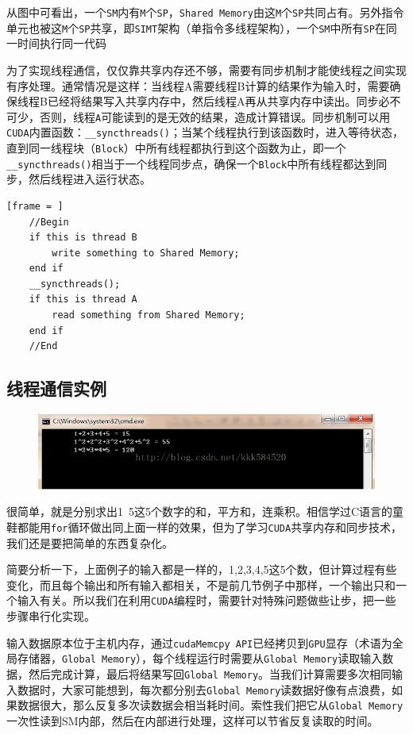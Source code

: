 \documentclass[UTF8,a4paper,12pt]{ctexbook}
\begin{document}
			从图中可看出，一个\verb|SM|内有\verb|M|个\verb|SP|，\verb|Shared Memory|由这\verb|M|个\verb|SP|共同占有。另外指令单元也被这\verb|M|个\verb|SP|共享，即\verb|SIMT|架构（单指令多线程架构），一个\verb|SM|中所有\verb|SP|在同一时间执行同一代码
			
			为了实现线程通信，仅仅靠共享内存还不够，需要有同步机制才能使线程之间实现有序处理。通常情况是这样：当线程A需要线程B计算的结果作为输入时，需要确保线程B已经将结果写入共享内存中，然后线程A再从共享内存中读出。同步必不可少，否则，线程\verb|A|可能读到的是无效的结果，造成计算错误。同步机制可以用\verb|CUDA|内置函数：\verb|__syncthreads()|；当某个线程执行到该函数时，进入等待状态，直到同一线程块（\verb|Block|）中所有线程都执行到这个函数为止，即一个\verb|__syncthreads()|相当于一个线程同步点，确保一个\verb|Block|中所有线程都达到同步，然后线程进入运行状态。
			
			\begin{lstlisting}[frame = ]
	//Begin   
	if this is thread B   
		write something to Shared Memory;   
	end if   
	__syncthreads();   
	if this is thread A   
		read something from Shared Memory;   
	end if   
	//End   
			\end{lstlisting} 
			
			\subsection{线程通信实例}
			
				\begin{figure}[hb]
					\centering
					\includegraphics[scale = 0.8]{ExampleInfo.png}
				\end{figure}
				
			很简单，就是分别求出1~5这5个数字的和，平方和，连乘积。相信学过C语言的童鞋都能用\verb|for|循环做出同上面一样的效果，但为了学习\verb|CUDA|共享内存和同步技术，我们还是要把简单的东西复杂化。 
			
			简要分析一下，上面例子的输入都是一样的，1,2,3,4,5这5个数，但计算过程有些变化，而且每个输出和所有输入都相关，不是前几节例子中那样，一个输出只和一个输入有关。所以我们在利用\verb|CUDA|编程时，需要针对特殊问题做些让步，把一些步骤串行化实现。
			 
			输入数据原本位于主机内存，通过\verb|cudaMemcpy API|已经拷贝到\verb|GPU|显存（术语为全局存储器，\verb|Global Memory|），每个线程运行时需要从\verb|Global Memory|读取输入数据，然后完成计算，最后将结果写回\verb|Global Memory|。当我们计算需要多次相同输入数据时，大家可能想到，每次都分别去\verb|Global Memory|读数据好像有点浪费，如果数据很大，那么反复多次读数据会相当耗时间。索性我们把它从\verb|Global Memory|一次性读到SM内部，然后在内部进行处理，这样可以节省反复读取的时间。 
			
\end{document}
